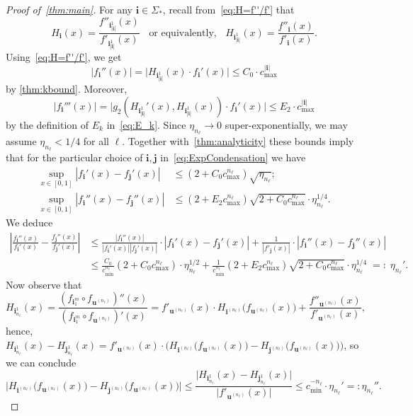 \documentclass[11pt,a4paper]{article}
\def\cref#1{\ref{#1}}%
\theoremstyle{definition}
\theoremstyle{remark}
\newcommand{\0}{\mathbf{0}}
\newcommand{\bi}{\mathbf{i}}
\newcommand{\bj}{\mathbf{j}}
\newcommand{\bu}{\mathbf{u}}
\numberwithin{equation}{section}
\begin{document}
\begin{proof}[Proof of~\cref{thm:main}]
For any $\bi\in\Sigma_*$, recall from~\cref{eq:H=f''/f'} that
\begin{equation*}
	H_{\bi}(x)= \frac{f''_{\bi_{|\bi|}^1}(x)}{f'_{\bi_{|\bi|}^1}(x)} \;\;\text{ or equivalently,
	}\;\; H_{\bi_{|\bi|}^1}(x) = \frac{f''_{\bi}(x)}{f'_{\bi}(x)}.
\end{equation*}
Using~\eqref{eq:H=f''/f'}, we get 
\begin{equation*}
 |f_{\bi}''(x)| = \big|H_{\bi_{|\bi|}^1}(x)\cdot f_{\bi}'(x)\big|\leq C_0 \cdot c_{\max}^{|\bi|}
\end{equation*}
by \cref{thm:kbound}. Moreover,
\begin{equation*}
  |f_{\bi}'''(x)| = \big|g_2(H_{\bi_{|\bi|}^1}'(x),H_{\bi_{|\bi|}^1}(x))\cdot f_{\bi}'(x)\big| \leq
  E_2\cdot c_{\max}^{|\bi|}
\end{equation*}
by the definition of $E_k$ in~\cref{eq:E_k}. Since $\eta_{n_\ell}\to 0$ super-exponentially, we may
assume $\eta_{n_\ell}<1/4$ for all $\ell$. Together with~\cref{thm:analyticity} these bounds imply
that for the particular choice of $\bi,\bj$ in~\cref{eq:ExpCondensation} we have
\begin{align*}
 \sup_{x\in[0,1]}|f_{\bi}'(x) - f_{\bj}'(x)| &\leq (2+C_0 c_{\max}^{n_\ell})\sqrt{\eta_{n_\ell}}; \\
 \sup_{x\in[0,1]}|f_{\bi}''(x) - f_{\bj}''(x)| &\leq (2+E_2c_{\max}^{n_\ell})\sqrt{2+C_0
 	c_{\max}^{n_\ell}}\cdot
 \eta_{n_\ell}^{1/4}.
\end{align*}
We deduce
\begin{align*}
	\left|\frac{f_{\bi}''(x)}{f_{\bi}'(x)} - \frac{f_{\bj}''(x)}{f_{\bj}'(x)}\right|
	&\leq
	\frac{|f_{\bi}''(x)|}{|f_{\bi}'(x)||f_{\bj}'(x)|}\cdot|f_{\bi}'(x) - f_{\bj}'(x)|
	+\frac{1}{|f'_{\bj}(x)|} \cdot |f_{\bi}''(x) - f_{\bj}''(x)|
	\\
	&
	\leq \frac{C_0}{c_{\min}^{n_\ell}}(2+C_0c_{\max}^{n_\ell})\cdot \eta_{n_\ell}^{1/2}
	+\frac{1}{c_{\min}^{n_\ell}}(2+E_2
	c_{\max}^{n_\ell})\sqrt{2+C_0 c_{\max}^{n_\ell}} \cdot \eta_{n_\ell}^{1/4} \;=:\;\eta_{n_\ell}'.
\end{align*}
Now observe that
\begin{equation*}
H_{\bi_{n_{\ell}}^1}(x) = \frac{(f_{\bi_1^m}\circ f_{\bu^{(n_{\ell})}})''(x)}{(f_{\bi_1^m}\circ
f_{\bu^{(n_{\ell})}})'(x)} = 
f'_{\bu^{(n_{\ell})}}(x) \cdot H_{\bi^{(n_{\ell})}} \big(f_{\bu^{(n_{\ell})}}(x)\big) + \frac{
f''_{\bu^{(n_{\ell})}}(x) }{ f'_{\bu^{(n_{\ell})}}(x)},
\end{equation*}
hence, $H_{\bi_{n_{\ell}}^1}(x)-H_{\bj_{n_{\ell}}^1}(x) = f'_{\bu^{(n_{\ell})}}(x) \cdot \big(
H_{\bi^{(n_{\ell})}} \big(f_{\bu^{(n_{\ell})}}(x)\big) -H_{\bj^{(n_{\ell})}}
\big(f_{\bu^{(n_{\ell})}}(x)\big) \big)$, so we can conclude
\[
\big| H_{\bi^{(n_{\ell})}} \big(f_{\bu^{(n_{\ell})}}(x)\big) -H_{\bj^{(n_{\ell})}}
\big(f_{\bu^{(n_{\ell})}}(x)\big) \big|
 \leq
 \frac{\big|H_{\bi_{n_{\ell}}^1}(x)-H_{\bj_{n_{\ell}}^1}(x)\big|}{\big|f'_{\bu^{(n_{\ell})}}(x)\big|}
 \leq c_{\min}^{-{n_\ell}}
\cdot \eta_{n_\ell}'
=:\eta_{n_\ell}''.
\]


\end{proof}
\end{document}
